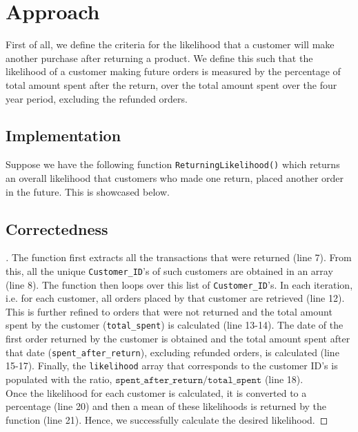 \documentclass[11pt]{report}
\begin{document}
\section{Approach}
First of all, we define the criteria for the likelihood that a customer will make another purchase after returning a product. We define this such that the likelihood of a customer making future orders is measured by the percentage of total amount spent after the return, over the total amount spent over the four year period, excluding the refunded orders.

\subsection{Implementation}
Suppose we have the following function \texttt{ReturningLikelihood()} which returns an overall likelihood that customers who made one return, placed another order in the future. This is showcased below. \\



\subsection{Correctedness}
\begin{proof}[\unskip\nopunct]
	The function first extracts all the transactions that were returned (line 7). From this, all the unique \texttt{Customer\_ID}'s of such customers are obtained in an array (line 8). The function then loops over this list of \texttt{Customer\_ID}'s. In each iteration, i.e. for each customer, all orders placed by that customer are retrieved (line 12). This is further refined to orders that were not returned and the total amount spent by the customer (\texttt{total\_spent}) is calculated (line 13-14). The date of the first order returned by the customer is obtained and the total amount spent after that date (\texttt{spent\_after\_return}), excluding refunded orders, is calculated (line 15-17). Finally, the \texttt{likelihood} array that corresponds to the customer ID's is populated with the ratio, $\texttt{spent\_after\_return}/ \texttt{total\_spent}$ (line 18).\\
	
	Once the likelihood for each customer is calculated, it is converted to a percentage (line 20) and then a mean of these likelihoods is returned by the function (line 21). Hence, we successfully calculate the desired likelihood.
\end{proof}
\end{document}
